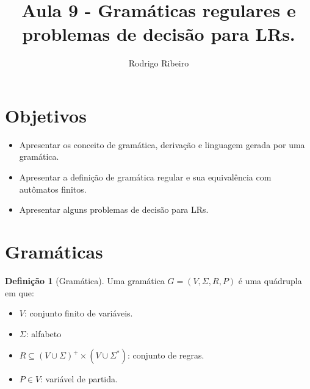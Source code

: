 \documentclass[a4paper]{article}
\theoremstyle{definition}
\newtheorem{Definition}{Definição}
\begin{document}
  \title{Aula 9 - Gramáticas regulares e problemas de decisão para LRs.}
  \author{Rodrigo Ribeiro}

  \maketitle


  \pagestyle{fancy}


  \section*{Objetivos}

  \begin{itemize}
     \item Apresentar os conceito de gramática, derivação e linguagem gerada por
       uma gramática.
     \item Apresentar a definição de gramática regular e sua equivalência com
       autômatos finitos.
     \item Apresentar alguns problemas de decisão para LRs.
  \end{itemize}

  \section{Gramáticas}

  \begin{Definition}[Gramática]
    Uma gramática $G=(V,\Sigma,R,P)$ é uma quádrupla em que:
    \begin{itemize}
       \item $V$: conjunto finito de variáveis.
       \item $\Sigma$: alfabeto
       \item $R\subseteq (V \cup \Sigma)^+ \times (V\cup \Sigma^*)$: conjunto de
         regras.
       \item $P\in V$: variável de partida.
    \end{itemize}
  \end{Definition}
\end{document}
